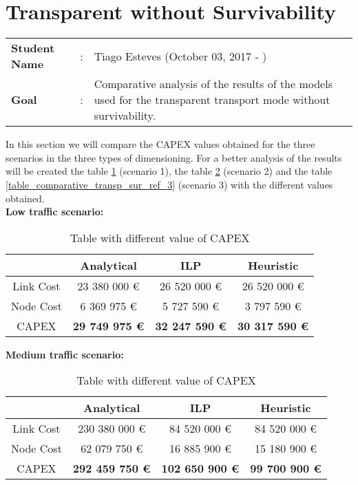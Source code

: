 \clearpage

\section{Transparent without Survivability}\label{comparative_Transp_Survivability}
\begin{tcolorbox}	
\begin{tabular}{p{2.75cm} p{0.2cm} p{10.5cm}} 	
\textbf{Student Name}  &:& Tiago Esteves    (October 03, 2017 - )\\
\textbf{Goal}          &:& Comparative analysis of the results of the models used for the transparent transport mode without survivability.
\end{tabular}
\end{tcolorbox}
\vspace{11pt}


In this section we will compare the CAPEX values obtained for the three scenarios in the three types of dimensioning. For a better analysis of the results will be created the table \ref{table_comparative_transp_sur_ref_1} (scenario 1), the table \ref{table_comparative_transp_sur_ref_2} (scenario 2) and the table \ref{table_comparative_transp_sur_ref_3} (scenario 3) with the different values obtained.\\

\textbf{Low traffic scenario:}

\begin{table}[h!]
\centering
\begin{tabular}{| c | c | c | c |}
 \hline
   & Analytical & ILP & Heuristic \\
 \hline\hline
 Link Cost & 23 380 000 \euro & 26 520 000 \euro & 26 520 000 \euro \\
 Node Cost & 6 369 975 \euro & 5 727 590 \euro & 3 797 590 \euro \\
 CAPEX & \textbf{29 749 975 \euro} & \textbf{32 247 590 \euro} & \textbf{30 317 590 \euro} \\
 \hline
\end{tabular}
\caption{Table with different value of CAPEX }
\label{table_comparative_transp_sur_ref_1}
\end{table}


\vspace{11pt}
\textbf{Medium traffic scenario:}

\begin{table}[h!]
\centering
\begin{tabular}{| c | c | c | c |}
 \hline
   & Analytical & ILP & Heuristic \\
 \hline\hline
 Link Cost & 230 380 000 \euro & 84 520 000 \euro & 84 520 000 \euro \\
 Node Cost & 62 079 750 \euro & 16 885 900 \euro & 15 180 900 \euro \\
 CAPEX & \textbf{292 459 750 \euro} & \textbf{102 650 900 \euro} & \textbf{99 700 900 \euro} \\
 \hline
\end{tabular}
\caption{Table with different value of CAPEX }
\label{table_comparative_transp_sur_ref_2}
\end{table}


